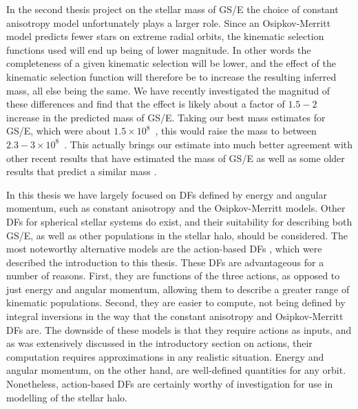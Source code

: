 In the second thesis project on the stellar mass of GS/E the choice of constant anisotropy model unfortunately plays a larger role. Since an Osipkov-Merritt model predicts fewer stars on extreme radial orbits, the kinematic selection functions used will end up being of lower magnitude. In other words the completeness of a given kinematic selection will be lower, and the effect of the kinematic selection function will therefore be to increase the resulting inferred mass, all else being the same. We have recently investigated the magnitud of these differences and find that the effect is likely about a factor of $1.5-2$ increase in the predicted mass of GS/E. Taking our best mass estimates for GS/E, which were about $1.5\times10^{8}$~\Msun, this would raise the mass to between $2.3-3\times10^{8}$~\Msun. This actually brings our estimate into much better agreement with other recent results that have estimated the mass of GS/E \parencite[e.g.][]{han22,carrillo23} as well as some older results that predict a similar mass \parencite[e.g.][]{kruijssen19b,mackereth20}.

In this thesis we have largely focused on DFs defined by energy and angular momentum, such as constant anisotropy and the Osipkov-Merritt models. Other DFs for spherical stellar systems do exist, and their suitability for describing both GS/E, as well as other populations in the stellar halo, should be considered. The most noteworthy alternative models are the action-based DFs \parencite{binney12d,posti15}, which were described the introduction to this thesis. These DFs are advantageous for a number of reasons. First, they are functions of the three actions, as opposed to just energy and angular momentum, allowing them to describe a greater range of kinematic populations. Second, they are easier to compute, not being defined by integral inversions in the way that the constant anisotropy and Osipkov-Merritt DFs are. The downside of these models is that they require actions as inputs, and as was extensively discussed in the introductory section on actions, their computation requires approximations in any realistic situation. Energy and angular momentum, on the other hand, are well-defined quantities for any orbit. Nonetheless, action-based DFs are certainly worthy of investigation for use in modelling of the stellar halo.

